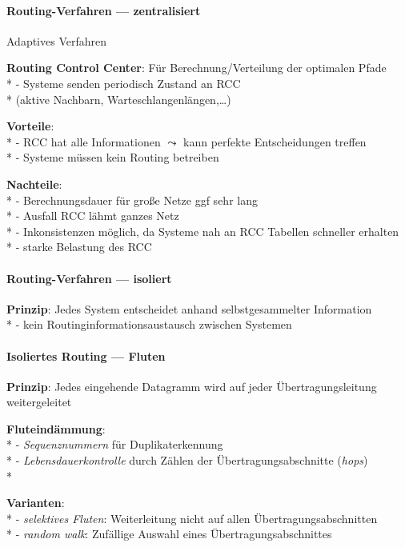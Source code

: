 \paragraph{Routing-Verfahren --- zentralisiert}
\begin{items}
  \item Adaptives Verfahren
  \item \textbf{Routing Control Center}: Für Berechnung/Verteilung der optimalen Pfade \\*
    - Systeme senden periodisch Zustand an RCC \\* \phantom{-} \phantom{\( \cdot \)} (aktive Nachbarn, Warteschlangenlängen,\dots)
  \item \textbf{Vorteile}: \\*
    - RCC hat alle Informationen \( \leadsto \) kann perfekte Entscheidungen treffen \\*
    - Systeme müssen kein Routing betreiben
  \item \textbf{Nachteile}: \\*
    - Berechnungsdauer für große Netze ggf sehr lang \\*
    - Ausfall RCC lähmt ganzes Netz \\*
    - Inkonsistenzen möglich, da Systeme nah an RCC Tabellen schneller erhalten \\*
    - starke Belastung des RCC
\end{items}

\paragraph{Routing-Verfahren --- isoliert}
\begin{items}
  \item \textbf{Prinzip}: Jedes System entscheidet anhand selbstgesammelter Information \\*
    - kein Routinginformationsaustausch zwischen Systemen
\end{items}

\paragraph{Isoliertes Routing --- Fluten}
\begin{items}
  \item \textbf{Prinzip}: Jedes eingehende Datagramm wird auf jeder Übertragungsleitung weitergeleitet
  \item \textbf{Fluteindämmung}: \\*
    - \emph{Sequenznummern} für Duplikaterkennung \\*
    - \emph{Lebensdauerkontrolle} durch Zählen der Übertragungsabschnitte (\emph{hops}) \\*
  \item \textbf{Varianten}: \\*
    - \emph{selektives Fluten}: Weiterleitung nicht auf allen Übertragungsabschnitten \\*
    - \emph{random walk}: Zufällige Auswahl eines Übertragungsabschnittes
\end{items}

